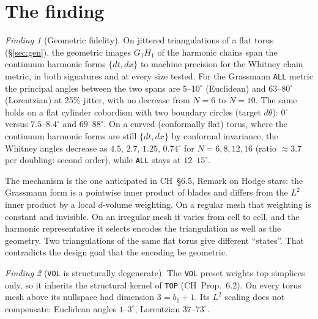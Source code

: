 \documentclass[11pt]{article}
\theoremstyle{definition}
\theoremstyle{plain}
\theoremstyle{remark}
\newtheorem{finding}{Finding}[section]
\newcommand{\ttt}[1]{\texttt{#1}}
\begin{document}
\section{The finding}\label{sec:finding}

\begin{finding}[Geometric fidelity]\label{find:main}
On jittered triangulations of a flat torus (\S\ref{sec:gen}), the geometric images \(G_1H_1\) of the harmonic chains span the continuum harmonic forms \(\{dt,dx\}\) to machine precision for the Whitney chain metric, in both signatures and at every size tested. For the Grassmann \ttt{ALL} metric the principal angles between the two spans are \(5\)--\(10^{\circ}\) (Euclidean) and \(63\)--\(80^{\circ}\) (Lorentzian) at 25\% jitter, with no decrease from \(N=6\) to \(N=10\). The same holds on a flat cylinder cobordism with two boundary circles (target \(d\theta\)): \(0^{\circ}\) versus \(7.5\)--\(8.4^{\circ}\) and \(69\)--\(88^{\circ}\). On a curved (conformally flat) torus, where the continuum harmonic forms are still \(\{dt,dx\}\) by conformal invariance, the Whitney angles decrease as \(4.5,\,2.7,\,1.25,\,0.74^{\circ}\) for \(N=6,8,12,16\) (ratio \(\approx3.7\) per doubling: second order), while \ttt{ALL} stays at \(12\)--\(15^{\circ}\).
\end{finding}

The mechanism is the one anticipated in CH~\S6.5, Remark on Hodge stars: the Grassmann form is a pointwise inner product of blades and differs from the \(L^{2}\) inner product by a local \(d\)-volume weighting. On a regular mesh that weighting is constant and invisible. On an irregular mesh it varies from cell to cell, and the harmonic representative it selects encodes the triangulation as well as the geometry. Two triangulations of the same flat torus give different ``states''. That contradicts the design goal that the encoding be geometric.

\begin{finding}[\ttt{VOL} is structurally degenerate]
The \ttt{VOL} preset weights top simplices only, so it inherits the structural kernel of \ttt{TOP} (CH~Prop.~6.2). On every torus mesh above its nullspace had dimension \(3=b_1+1\). Its \(L^{2}\) scaling does not compensate: Euclidean angles \(1\)--\(3^{\circ}\), Lorentzian \(37\)--\(73^{\circ}\).
\end{finding}
\end{document}
